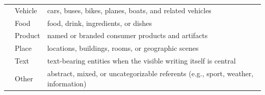 \begin{table}[t]
\begin{tabular}{p{}p{}p{}}
& Vehicle & cars, buses, bikes, planes, boats, and related vehicles \\
& Food & food, drink, ingredients, or dishes \\
& Product & named or branded consumer products and artifacts \\
& Place & locations, buildings, rooms, or geographic scenes \\
& Text & text-bearing entities when the visible writing itself is central \\
& Other & abstract, mixed, or uncategorizable referents (e.g., sport, weather, information) \\
\bottomrule
\end{tabular}
\end{table}
